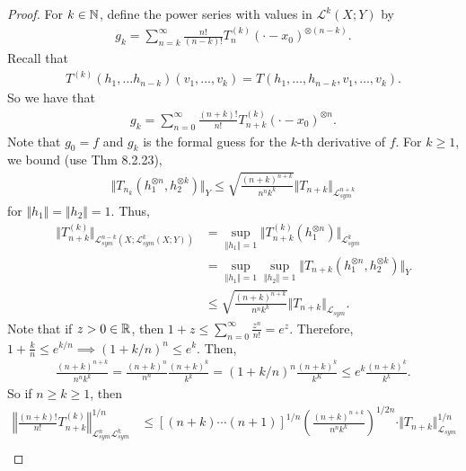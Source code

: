 \documentclass{report}
\begin{document}
\begin{proof}
    For $k \in \NN$, define the power series with values in $\mathcal L^k(X; Y)$ by 
    \begin{align*}
        g_k = \sum_{n=k}^\infty \frac{n!}{(n-k)!} T_n^{(k)}(\cdot - x_0)^{\otimes (n-k)}.
    \end{align*}
    Recall that 
    \begin{align*}
        T^{(k)}(h_1, \ldots h_{n-k})(v_1, \ldots, v_k) = T(h_1, \ldots, h_{n-k}, v_1, \ldots, v_k).
    \end{align*}
    So we have that 
    \begin{align*}
        g_k = \sum_{n=0}^\infty \frac{(n+k)!}{n!} T_{n+k}^{(k)}(\cdot - x_0)^{\otimes n}.
    \end{align*}
    Note that $g_0 = f$ and $g_k$ is the formal guess for the $k$-th derivative of $f$. For $k \geq 1$, we bound (use Thm 8.2.23),
    \begin{align*}
        \Vert T_{n_k}(h_1^{\otimes n}, h_2^{\otimes k}) \Vert_Y \leq \sqrt{\frac{(n+k)^{n+k}}{n^nk^k}} \Vert T_{n+k}\Vert_{\mathcal L^{n+k}_{sym}}
    \end{align*}
    for $\Vert h_1 \Vert = \Vert h_2 \Vert = 1$. Thus, 
    \begin{align*}
        \Vert T_{n+k}^{(k)}\Vert_{\mathcal L^{n-k}_{sym}(X; \mathcal L_{sym}^k(X; Y))} &= \sup_{\Vert h_1\Vert = 1} \Vert T_{n+k}^{(k)} (h_1^{\otimes n})\Vert_{\mathcal L^k_{sym}} \\
        &=\sup_{\Vert h_1\Vert = 1} \sup_{\Vert h_2\Vert = 1} \Vert T_{n+k}(h_1^{\otimes n}, h_2^{\otimes k})\Vert_{Y} \\
        &\leq \sqrt{\frac{(n+k)^{n+k}}{n^nk^k}} \Vert T_{n+k}\Vert_{\mathcal L_{sym}}.
    \end{align*}
    Note that if $z > 0 \in \RR$, then $1 + z \leq \sum_{n=0}^\infty \frac{z^n}{n!} = e^z$. Therefore, $1 + \frac kn \leq e^{k/n} \implies (1 + k/n)^n \leq e^k$. Then,
    \begin{align*}
        \frac{(n+k)^{n+k}}{n^nk^k} = \frac{(n+k)^n}{n^n} \frac{(n+k)^k}{k^k} = (1 + k/n)^n \frac{(n+k)^k}{k^K }\leq e^k \frac{(n+k)^k}{k^k}.
    \end{align*}
    So if $n \geq k \geq 1$, then 
    \begin{align*}
        \left\Vert \frac{(n+k)!}{n!} T_{n+k}^{(k)}\right\Vert^{1/n}_{\mathcal L^n_{sym} \mathcal L_{sym}^k} &\leq [(n+k)\cdots(n+1)]^{1/n} \left( \frac{(n+k)^{n+k}}{n^nk^k}\right)^{1/2n} \cdot \Vert T_{n+k} \Vert_{\mathcal L_{sym}}^{1/n} \\

\end{align*}
\end{proof}
\end{document}
